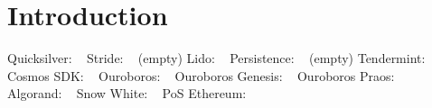 \section{Introduction}

Quicksilver: ~\cite{quicksilver}
Stride: ~\cite{stride} (empty)
Lido: ~\cite{lido}
Persistence: ~\cite{persistence} (empty)
Tendermint: ~\cite{2018tendermint, buchman2016tendermint}
Cosmos SDK: ~\cite{cosmossdk}
Ouroboros: ~\cite{ouroboros}
Ouroboros Genesis: ~\cite{ouroboros-genesis}
Ouroboros Praos: ~\cite{praos}
Algorand: ~\cite{algorand}
Snow White: ~\cite{DBLP:journals/iacr/BentovPS16a}
PoS Ethereum: ~\cite{casper,buterin2020combining,sompolinsky2015secure,kiayias2017trees}